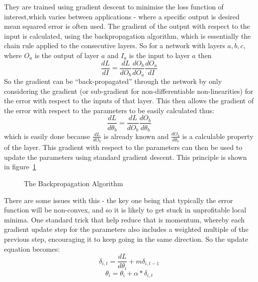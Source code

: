 They are trained using gradient descent to minimise the loss function of interest,which varies between applications - where a specific output is desired mean squared error is often used. The gradient of the output with respect to the input is calculated, using the backpropagation algorithm, which is essentially the chain rule applied to the consecutive layers. So for a network with layers $a, b, c$, where $O_a$ is the output of layer $a$ and $I_a$ is the input to layer $a$ then 
\begin{equation}
\frac{dL}{dI}  = \frac{dL}{dO_b} \frac{dO_b}{dO_a} \frac{dO_a}{dI} 
\end{equation} 
So the gradient can be ``back-propagated'' through the network by only considering the gradient (or sub-gradient for non-differentiable non-linearities) for the error with respect to the inputs of that layer. This then allows the gradient of the error with respect to the parameters to be easily calculated thus:
\begin{equation}
\frac{dL}{d\theta_b} = \frac{dL}{dO_b}\frac{dO_b}{d\theta_b} 
\end{equation}
which is easily done because $\frac{dL}{dO_b}$ is already known and $\frac{dO_b}{d\theta_b}$ is a calculable property of the layer. This gradient with respect to the parameters can then be used to update the parameters using standard gradient descent. This principle is shown in figure~\ref{fig:backprop}

\begin{figure}
\centering

\caption{The Backpropagation Algorithm}
\label{fig:backprop}
\end{figure}

There are some issues with this - the key one being  that typically the error function will be non-convex, and so it is likely to get stuck in unprofitable local minima. One standard trick that help reduce that is momentum, whereby each gradient update step for the parameters also includes a weighted multiple of the previous step, encouraging it to keep going in the same direction. So the update equation becomes:
\begin{equation*}
\delta_{i,t} = \frac{dL}{d\theta_i} + m\delta_{i,t-1}
\end{equation*}
\begin{equation}
\theta_i = \theta_i  + \alpha * \delta_{i,t}
\end{equation}

